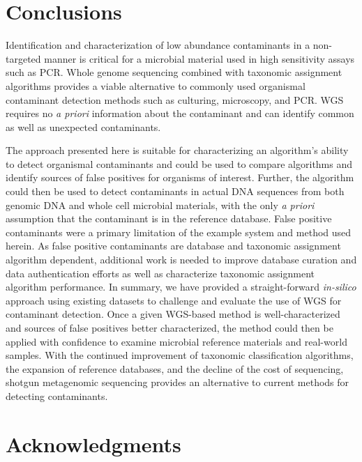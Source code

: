 \documentclass[fleqn,10pt,lineno]{wlpeerj}\usepackage[]{graphicx}\usepackage[]{color}
\begin{document}
\section*{Conclusions}
Identification and characterization of low abundance contaminants in a non-targeted manner is critical for a microbial material used in high sensitivity assays such as PCR.
Whole genome sequencing combined with taxonomic assignment algorithms provides a viable alternative to commonly used organismal contaminant detection methods such as culturing, microscopy, and PCR. 
WGS requires no \textit{a priori} information about the contaminant and can identify common as well as unexpected contaminants.

The approach presented here is suitable for characterizing an algorithm’s ability to detect organismal contaminants and could be used to compare algorithms and identify sources of false positives for organisms of interest.  Further, the algorithm could then be used to detect contaminants in actual DNA sequences from both genomic DNA and whole cell microbial materials, with the only \textit{a priori} assumption that the contaminant is in the reference database. 
False positive contaminants were a primary limitation of the example system and method used herein. 
As false positive contaminants are database and taxonomic assignment algorithm dependent, additional work is needed to improve database curation and data authentication efforts as well as characterize taxonomic assignment algorithm performance. 
In summary, we have provided a straight-forward \textit{in-silico} approach using existing datasets to challenge and evaluate the use of WGS for contaminant detection. 
Once a given WGS-based method is well-characterized and sources of false positives better characterized, the method could then be applied with confidence to examine microbial reference materials and real-world samples. 
With the continued improvement of taxonomic classification algorithms, the expansion of reference databases, and the decline of the cost of sequencing, shotgun metagenomic sequencing provides an alternative to current methods for detecting contaminants.


\section*{Acknowledgments}
\end{document}
